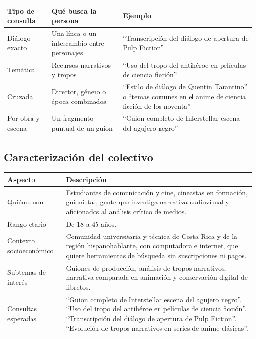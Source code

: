 \documentclass[11pt,spanish]{article}
\begin{document}
\begin{center}
\begin{tabularx}{\linewidth}{YYY}
\toprule
\textbf{Tipo de consulta} & \textbf{Qué busca la persona} & \textbf{Ejemplo} \\
\midrule
Diálogo exacto & Una línea o un intercambio entre personajes & ``Transcripción del diálogo de apertura de Pulp Fiction'' \\
Temática & Recursos narrativos y tropos & ``Uso del tropo del antihéroe en películas de ciencia ficción'' \\
Cruzada & Director, género o época combinados & ``Estilo de diálogo de Quentin Tarantino'' o ``temas comunes en el anime de ciencia ficción de los noventa'' \\
Por obra y escena & Un fragmento puntual de un guion & ``Guion completo de Interstellar escena del agujero negro'' \\
\bottomrule
\end{tabularx}
\end{center}

\subsection{Caracterización del colectivo}

\begin{center}
\begin{tabularx}{\linewidth}{lY}
\toprule
\textbf{Aspecto} & \textbf{Descripción} \\
\midrule
Quiénes son & Estudiantes de comunicación y cine, cineastas en formación, guionistas, gente que investiga narrativa audiovisual y aficionados al análisis crítico de medios. \\
Rango etario & De 18 a 45 años. \\
Contexto socioeconómico & Comunidad universitaria y técnica de Costa Rica y de la región hispanohablante, con computadora e internet, que quiere herramientas de búsqueda sin suscripciones ni pagos. \\
Subtemas de interés & Guiones de producción, análisis de tropos narrativos, narrativa comparada en animación y conservación digital de libretos. \\
Consultas esperadas & ``Guion completo de Interstellar escena del agujero negro''. ``Uso del tropo del antihéroe en películas de ciencia ficción''. ``Transcripción del diálogo de apertura de Pulp Fiction''. ``Evolución de tropos narrativos en series de anime clásicas''. \\
\bottomrule
\end{tabularx}
\end{center}
\end{document}
